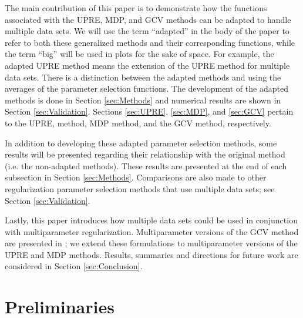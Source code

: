 \documentclass[12pt]{article}
\begin{document}
The main contribution of this paper is to demonstrate how the functions associated with the UPRE, MDP, and GCV methods can be adapted to handle multiple data sets. We will use the term ``adapted'' in the body of the paper to refer to both these generalized methods and their corresponding functions, while the term ``big'' will be used in plots for the sake of space. For example, the adapted UPRE method means the extension of the UPRE method for multiple data sets. There is a distinction between the adapted methods and using the averages of the parameter selection functions. The development of the adapted methods is done in Section \ref{sec:Methods} and numerical results are shown in Section \ref{sec:Validation}. Sections \ref{sec:UPRE}, \ref{sec:MDP}, and \ref{sec:GCV} pertain to the UPRE, method, MDP method, and the GCV method, respectively. \par 
In addition to developing these adapted parameter selection methods, some results will be presented regarding their relationship with the original method (i.e. the non-adapted methods). These results are presented at the end of each subsection in Section \ref{sec:Methods}. Comparisons are also made to other regularization parameter selection methods that use multiple data sets; see Section \ref{sec:Validation}. \par
Lastly, this paper introduces how multiple data sets could be used in conjunction with multiparameter regularization. Multiparameter versions of the GCV method are presented in \cite{ChungEasleyOLeary,ModarresiGolub2}; we extend these formulations to multiparameter versions of the UPRE and MDP methods. Results, summaries and directions for future work are considered in Section \ref{sec:Conclusion}.

\section{Preliminaries} \label{sec:Preliminaries}
\end{document}

